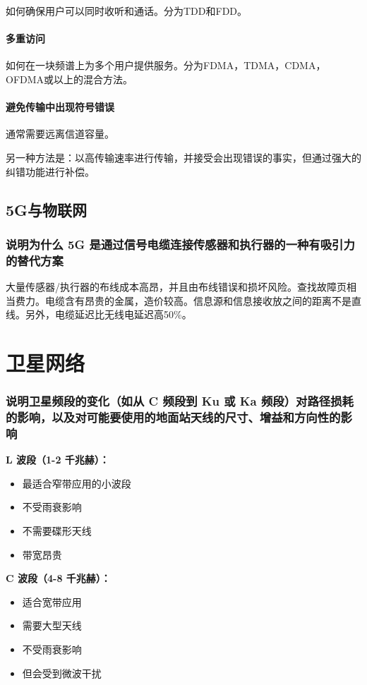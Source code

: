如何确保用户可以同时收听和通话。分为TDD和FDD。

\subsubsection{多重访问}

如何在一块频谱上为多个用户提供服务。分为FDMA，TDMA，CDMA，OFDMA或以上的混合方法。

\subsubsection{避免传输中出现符号错误}

通常需要远离信道容量。

另一种方法是：以高传输速率进行传输，并接受会出现错误的事实，但通过强大的纠错功能进行补偿。

\section{5G与物联网}

\subsection{说明为什么 5G 是通过信号电缆连接传感器和执行器的一种有吸引力的替代方案}

大量传感器/执行器的布线成本高昂，并且由布线错误和损坏风险。查找故障页相当费力。电缆含有昂贵的金属，造价较高。信息源和信息接收放之间的距离不是直线。另外，电缆延迟比无线电延迟高50\%。

\chapter{卫星网络}

\subsection{说明卫星频段的变化（如从 C 频段到 Ku 或 Ka 频段）对路径损耗的影响，以及对可能要使用的地面站天线的尺寸、增益和方向性的影响}

\textbf{L 波段（1-2 千兆赫）：}
\begin{itemize}
	\item 最适合窄带应用的小波段
	\item 不受雨衰影响
	\item 不需要碟形天线
	\item 带宽昂贵
\end{itemize}

\textbf{C 波段（4-8 千兆赫）：}
\begin{itemize}
	\item 适合宽带应用
	\item 需要大型天线
	\item 不受雨衰影响
	\item 但会受到微波干扰
\end{itemize}

